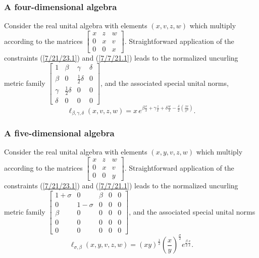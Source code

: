\documentclass{amsart}
\numberwithin{equation}{section}
\theoremstyle{definition}
\numberwithin{theorem}{section}
\begin{document}
 \subsubsection{A four-dimensional algebra} Consider the real unital algebra with elements 
$(x,v,z,w)$ which multiply according to the matrices 
$\left[
\begin{array}{ccccc}
x & z & w   \\
0 & x & v \\
0 & 0 & x  
\end{array}
\right]$.
Straightforward application of the constraints (\ref{7/21/23.1}) and (\ref{7/7/21.1}) leads to the normalized uncurling metric family 
$\left[
\begin{array}{cccc}
1 & \beta & \gamma & \delta   \\
\beta & 0 & \frac{1}{2}\delta & 0 \\
\gamma & \frac{1}{2}\delta &  0 & 0   \\
\delta & 0 &  0 & 0
\end{array}
\right]$, and the associated special unital norms,
\[ \ell_{\beta,\gamma,\delta}(x,v,z,w) = x\, e^{\beta\frac{v}{x} + \gamma\frac{z}{x} +\delta\frac{w}{x}- \frac{\delta}{2}\left(\frac{zv}{x^2}\right)}.\]


\subsubsection{A five-dimensional algebra}Consider the real unital algebra with elements 
$(x,y,v,z,w)$ which multiply according to the matrices
$\left[
\begin{array}{ccccc}
x & z & w   \\
0 & x & v \\
0 & 0 & y  
\end{array}
\right]$.
Straightforward application of the constraints (\ref{7/21/23.1}) and (\ref{7/7/21.1}) leads to the normalized uncurling metric family 
$\left[
\begin{array}{ccccc}
1+\sigma & 0 & \beta & 0 & 0   \\
0 & 1-\sigma & 0 & 0 & 0 \\
\beta & 0 &  0 & 0 & 0  \\
0 & 0 &  0 & 0 & 0  \\
0 & 0 &  0 & 0 & 0
\end{array}
\right]$, and the associated special unital norms 
\[ \ell_{\sigma,\beta}(x,y,v,z,w) =  (xy)^{\frac{1}{2}}\left(\frac{x}{y}\right)^{\frac{\sigma}{2}} e^{\frac{\beta}{2} \frac{v}{x}}.\]
\end{document}
